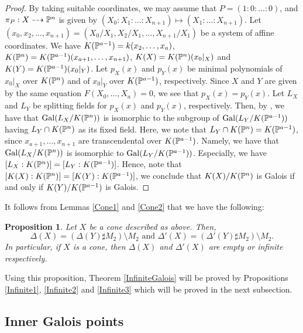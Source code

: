 \documentclass[10pt,oneside]{amsart}
\newtheorem{proposition}{Proposition}
\theoremstyle{definition}
\begin{document}
\begin{proof}
By taking suitable coordinates, we may assume that $P=(1:0:\dots:0)$, and $\pi_P:X \dashrightarrow \Bbb P^n$ is given by $(X_0:X_1:\dots:X_{n+1}) \mapsto (X_1:\dots:X_{n+1})$. Let $(x_0, x_2, \dots, x_{n+1}) = (X_0/X_1, X_2/X_1, \dots, X_{n+1}/X_1)$ be a system of affine coordinates. We have $K(\Bbb P^{a-1})=k(x_2, \dots, x_a)$, $K(\Bbb P^n)=K(\Bbb P^{a-1})(x_{a+1}, \dots, x_{n+1})$, $K(X)=K(\Bbb P^{n})(x_0|_X)$ and $K(Y)=K(\Bbb P^{a-1})(x_0|_Y)$. Let $p_X(x)$ and $p_Y(x)$ be minimal polynomials of $x_0|_X$ over $K(\Bbb P^{n})$ and of $x_0|_Y$ over $K(\Bbb P^{a-1})$, respectively. Since $X$ and $Y$ are given by the same equation $F(X_0, \dots, X_a)=0$, we see that $p_X(x)=p_Y(x)$. Let $L_X$ and $L_Y$ be splitting fields for $p_X(x)$ and $p_Y(x)$, respectively. Then, by \cite[Theorem~29]{artin},  
we have that ${\mathop{\mathrm{Gal}}\nolimits}(L_X/K(\Bbb P^{n}))$ is isomorphic to the subgroup of ${\mathop{\mathrm{Gal}}\nolimits}(L_Y/K(\Bbb P^{a-1}))$ having $L_Y \cap K(\Bbb P^{n})$ as its fixed field. Here, we note that $L_Y \cap K(\Bbb P^{n}) = K(\Bbb P^{a-1})$, since $x_{a+1}, \dots, x_{n+1}$ are transcendental over $K(\Bbb P^{a-1})$. Namely, we have that ${\mathop{\mathrm{Gal}}\nolimits}(L_X/K(\Bbb P^{n}))$ is isomorphic to ${\mathop{\mathrm{Gal}}\nolimits}(L_Y/K(\Bbb P^{a-1}))$. Especially, we have $[L_X:K(\Bbb P^{n})]=[L_Y:K(\Bbb P^{a-1})]$. Hence, note that $[K(X):K(\Bbb P^n)]=[K(Y):K(\Bbb P^{a-1})]$, we conclude that $K(X)/K(\Bbb P^n)$ is Galois if and only if $K(Y)/K(\Bbb P^{a-1})$ is Galois. 
\end{proof}

It follows from Lemmas \ref{Cone1} and \ref{Cone2} that we have the following: 
\begin{proposition} \label{Cone3} 
Let $X$ be a cone described as above. 
Then, 
$$ \Delta(X)=(\Delta(Y) \sharp M_2) \setminus M_2 \mbox{ and } \Delta'(X)=(\Delta'(Y) \sharp M_2) \setminus M_2.  $$
In particular, if $X$ is a cone, then $\Delta(X)$ and $\Delta'(X)$ are empty or infinite respectively. 
\end{proposition}

Using this proposition, Theorem \ref{InfiniteGalois} will be proved by Propositions \ref{Infinite1}, \ref{Infinite2} and \ref{Infinite3} which will be proved in the next subsection. 
 

\subsection{Inner Galois points} 
\end{document}
